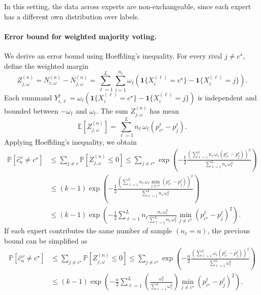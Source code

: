 In this setting, the data across experts are non-exchangeable, since each expert has a different own distribution over labels.

\paragraph{Error bound for weighted majority voting.}
We derive an error bound using Hoeffding’s inequality.
For every rival $j\neq c^\star$, define the weighted margin
$$
Z_{j,\omega}^{(n)}
= N_{c,\omega}^{(n)} - N_{j,\omega}^{(n)} 
    = \sum_{\ell=1}^L\sum_{i=1}^{n_\ell}
      \omega_\ell \left(\mathbf 1\{X_i^{(\ell)}=c^\star\}-\mathbf 1\{X_i^{(\ell)}=j\}\right).
$$
Each summand $Y_{i,\ell}^{j}=\omega_\ell \left(\mathbf 1\{X_i^{(\ell)}=c^\star\}-\mathbf 1\{X_i^{(\ell)}=j\}\right)$ is independent and bounded between $-\omega_\ell$ and $\omega_\ell$.
The sum $Z_{j,\omega}^{(n)}$ has mean
$$
\mathbb{E}\left[Z_{j,\omega}^{(n)}\right] = \sum_{\ell=1}^Ln_\ell \,\omega_\ell\left(p_{c^\star}^{\ell}-p_j^\ell \right).
$$
Applying Hoeffding’s inequality, we obtain
\begin{align*}
    \mathbb{P}\left[\hat{c}_n^\omega\neq c^\star\right]
    &\le \sum_{j\neq c}\mathbb{P}\left[Z_{j,\omega}^{(n)}\le 0\right]\le \sum_{j\neq c^\star}\exp\left(-\frac{1}{2}\frac{\left(\sum_{\ell=1}^L{n_\ell\,\omega_\ell\left(p_{c^\star}^\ell-p_j^\ell\right)}\right)^2}{\sum_{\ell = 1}^Ln_\ell \,\omega_\ell^2}\right)\\
    &\le(k-1) \exp\left(-\frac{1}{2}\frac{\left(\sum_{\ell=1}^L{n_\ell\,\omega_\ell\min_{j\neq c^\star}\left(p_{c^\star}^\ell-p_j^\ell\right)}\right)^2}{\sum_{\ell = 1}^Ln_\ell \,\omega_\ell^2}\right)\\
    &\le (k-1)\exp\left(-\frac{1}{2}\sum_{\ell=1}^Ln_\ell\frac{n_\ell\,\omega_\ell^2}{\sum_{\ell =1}^{L} n_\ell\,\omega_\ell^2}\min_{j\neq c^\star}\left(p_{c^\star}^\ell-p_j^\ell\right)^2\right).    
\end{align*}
If each expert contributes the same number of sample $(n_\ell = n)$, the previous bound can be simplified as
\begin{align*}
    \mathbb{P}\left[\hat{c}_n^\omega\neq c^\star\right]
    &\le \sum_{j\neq c^\star}\mathbb{P}\left[Z_{j,\omega}^{(n)}\le 0\right]\le \sum_{j\neq c^\star}\exp\left(-\frac{n}{2}\frac{\left(\sum_{\ell=1}^L\omega_\ell\left(p_{c^\star}^\ell-p_j^\ell\right)\right)^2}{\sum_{\ell=1}^L \omega_\ell^2}\right)\\
    &\le (k-1)\exp\left(-\frac{n}{2}\sum_{\ell=1}^L\left(\frac{\omega_\ell^2}{\sum_{\ell=1}^L\omega_\ell^2}\right)\min_{j\neq c^\star}\left(p_{c^\star}^\ell-p_j^\ell\right)^2\right).    
\end{align*}


